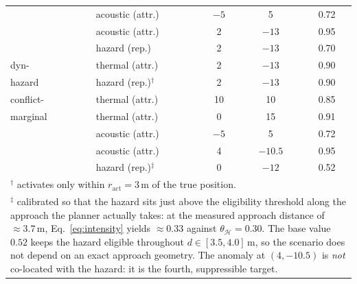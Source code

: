 \begin{table}[h]
\begin{tabular}{llccc}
        & acoustic (attr.) & $-5$ & 5   & 0.72\\
        & acoustic (attr.) & 2    & $-13$ & 0.95\\
        & hazard (rep.)    & 2    & $-13$ & 0.70\\
\hline
dyn-    & thermal (attr.)  & 2    & $-13$ & 0.90\\
hazard  & hazard (rep.)$^\dagger$ & 2 & $-13$ & 0.90\\
\hline
conflict- & thermal (attr.)  & 10   & 10  & 0.85\\
marginal  & thermal (attr.)  & 0    & 15  & 0.91\\
          & acoustic (attr.) & $-5$ & 5   & 0.72\\
          & acoustic (attr.) & 4    & $-10.5$ & 0.95\\
          & hazard (rep.)$^\ddagger$ & 0 & $-12$ & 0.52\\
\hline
\multicolumn{5}{l}{\footnotesize $^\dagger$ activates only within
  $r_{\mathrm{act}}=3$\,m of the true position.}\\
\multicolumn{5}{p{0.9\columnwidth}}{\footnotesize $^\ddagger$ calibrated so that the
hazard sits just above the eligibility threshold along the approach the planner
actually takes: at the measured approach distance of ${\approx}3.7$\,m,
Eq.~\eqref{eq:intensity} yields ${\approx}0.33$ against $\theta_{\mathcal{H}}=0.30$.
The base value $0.52$ keeps the hazard eligible throughout $d\in[3.5,4.0]$\,m, so the
scenario does not depend on an exact approach geometry. The anomaly at $(4,-10.5)$
is \emph{not} co-located with the hazard: it is the fourth, suppressible target.}\\
\end{tabular}
\end{table}

